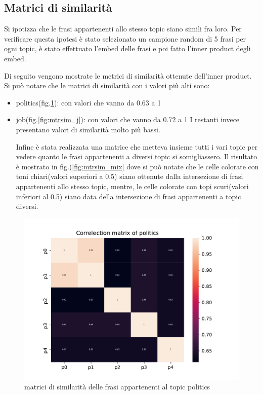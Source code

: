 \subsection{Matrici di similarità}
\label{ssec:mtrsim}
Si ipotizza che le frasi appartenenti allo stesso topic siano simili fra loro. Per verificare questa ipotesi è stato selezionato un campione random di 5 frasi per ogni topic, è stato effettuato l'embed delle frasi e poi fatto l'inner product degli embed.

Di seguito vengono mostrate le metrici di similarità ottenute dell'inner product. Si può notare che le matrici di similarità con i valori più alti sono:
\begin{itemize}
    \item politics(fig.\ref{fig:mtrsim_p}): con valori che vanno da 0.63 a 1
    \item job(fig.\ref{fig:mtrsim_j}): con valori che vanno da 0.72 a 1
I restanti invece presentano valori di similarità molto più bassi.

Infine è stata realizzata una matrice che metteva insieme tutti i vari topic per vedere quanto le frasi appartenenti a diversi topic si somigliassero. Il risultato è mostrato in fig.(\ref{fig:mtrsim_mix} dove si può notate che le celle colorate con toni chiari(valori superiori a 0.5) siano ottenute dalla intersezione di frasi appartenenti allo stesso topic, mentre, le celle colorate con topi scuri(valori inferiori al 0.5) siano data della intersezione di frasi appartenenti a topic diversi.
\end{itemize}
\begin{figure}[h!t]
    \centering
    \includegraphics{Figure/simMatr/politics.pdf}
    \caption{matrici di similarità delle frasi appartenenti al topic politics}
    \label{fig:mtrsim_p}
\end{figure}
\FloatBarrier

